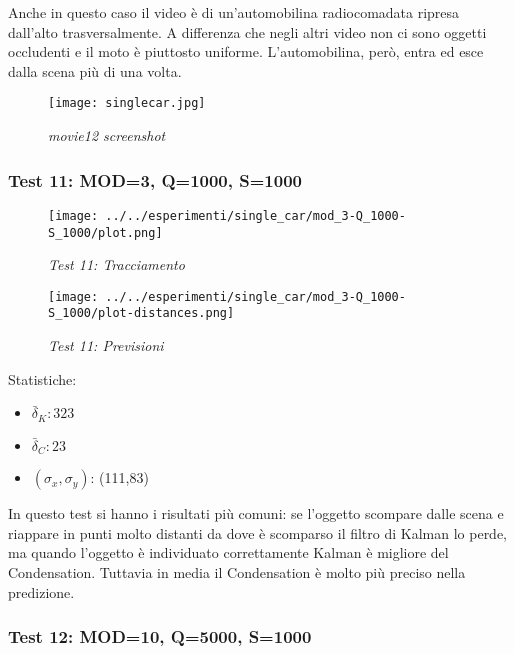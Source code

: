 Anche in questo caso il video è di un'automobilina radiocomadata ripresa dall'alto trasversalmente. A differenza che negli altri video non ci sono oggetti occludenti e il moto è piuttosto uniforme. L'automobilina, però, entra ed esce dalla scena più di una volta.

\begin{figure}[hb]
\centering
	\texttt{[image: singlecar.jpg]}
\caption{\textit{movie12 screenshot}}
\end{figure}

\newpage
\subsubsection{Test 11: MOD=3, Q=1000, S=1000}

\begin{figure}[hb]
\centering
\texttt{[image: ../../esperimenti/single\_car/mod\_3-Q\_1000-S\_1000/plot.png]}
\caption{\textit{Test 11: Tracciamento}}
\end{figure}

\begin{figure}[hb]
\centering
\texttt{[image: ../../esperimenti/single\_car/mod\_3-Q\_1000-S\_1000/plot-distances.png]}
\caption{\textit{Test 11: Previsioni}}
\end{figure}

Statistiche:
\begin{itemize}
\item \begin{math} \bar \delta_K: 323  \end{math}
\item \begin{math} \bar \delta_C: 23 \end{math}
\item \begin{math}(\sigma_x,\sigma_y)\end{math}: (111,83)
\end{itemize}

In questo test si hanno i risultati più comuni: se l'oggetto scompare dalle scena e riappare in punti molto distanti da dove è scomparso il filtro di Kalman lo perde, ma quando l'oggetto è individuato correttamente Kalman è migliore del Condensation. 
Tuttavia in media il Condensation è molto più preciso nella predizione.

\newpage
\subsubsection{Test 12: MOD=10, Q=5000, S=1000}

